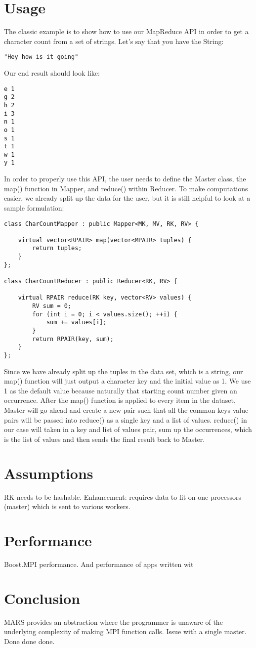 \documentclass[11pt]{article}
\begin{document}
\section{Usage}
The classic example is to show how to use our MapReduce API in order to get a character count from a set of strings. Let's say that you have the String:
\begin{verbatim}
"Hey how is it going"
\end{verbatim}
Our end result should look like:
\begin{verbatim}
e 1
g 2
h 2
i 3
n 1
o 1
s 1
t 1
w 1
y 1
\end{verbatim}
In order to properly use this API, the user needs to define the Master class, the map() function in Mapper, and reduce() within Reducer. To make computations easier, we already split up the data for the user, but it is still helpful to look at a sample formulation:
\begin{verbatim}
class CharCountMapper : public Mapper<MK, MV, RK, RV> {

    virtual vector<RPAIR> map(vector<MPAIR> tuples) {
        return tuples;
    }
};

class CharCountReducer : public Reducer<RK, RV> {

    virtual RPAIR reduce(RK key, vector<RV> values) {
        RV sum = 0;
        for (int i = 0; i < values.size(); ++i) {
            sum += values[i];
        }
        return RPAIR(key, sum);
    }
};
\end{verbatim}
Since we have already split up the tuples in the data set, which is a string, our map() function will just output a character key and the initial value as 1. We use 1 as the default value because naturally that starting count number given an occurrence. After the map() function is applied to every item in the dataset, Master will go ahead and create a new pair such that all the common keys value pairs will be passed into reduce() as a single key and a list of values. reduce() in our case will taken in a key and list of values pair, sum up the occurrences, which is the list of values and then sends the final result back to Master.
\section{Assumptions}
RK needs to be hashable. Enhancement: requires data to fit on one processors (master) which is sent to various  workers.

\section{Performance}
Boost.MPI performance. And performance of apps written wit

\section{Conclusion}
MARS provides an abstraction where the programmer is unaware of the underlying complexity of making MPI function calls. Issue with a single master. Done done done.
\end{document}
